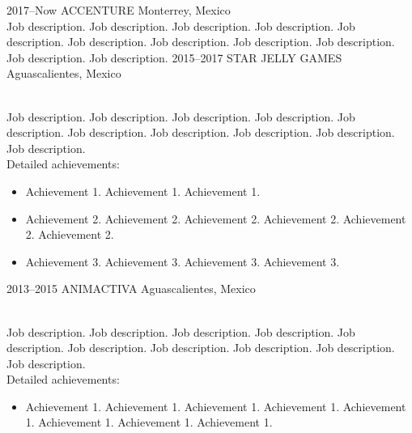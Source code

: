 \documentclass[]{cv-style}          %
\begin{document}
\begin{entrylist}
\entry
  {2017--Now}
  {ACCENTURE}
  {Monterrey, Mexico}
  {\\
  Job description. Job description. Job description. Job description. Job description. Job description. Job description. Job description. Job description. Job description. Job description.}
\entry
  {2015--2017}
  {STAR JELLY GAMES}
  {Aguascalientes, Mexico}
  {\\
  Job description. Job description. Job description. Job description. Job description. Job description. Job description. Job description. Job description. Job description.\\
  Detailed achievements:
  \begin{itemize}
    \item Achievement 1. Achievement 1. Achievement 1. 
    \item Achievement 2. Achievement 2. Achievement 2. Achievement 2. Achievement 2. Achievement 2.
    \item Achievement 3. Achievement 3. Achievement 3. Achievement 3.  
  \end{itemize}}
\entry
  {2013--2015}
  {ANIMACTIVA}
  {Aguascalientes, Mexico}
  {\\
  Job description. Job description. Job description. Job description. Job description. Job description. Job description. Job description. Job description. Job description.\\
  Detailed achievements:
  \begin{itemize}
    \item Achievement 1. Achievement 1. Achievement 1. Achievement 1. Achievement 1. Achievement 1. Achievement 1. Achievement 1. 
  \end{itemize}}

\end{entrylist}

%
%
%
\end{document}
